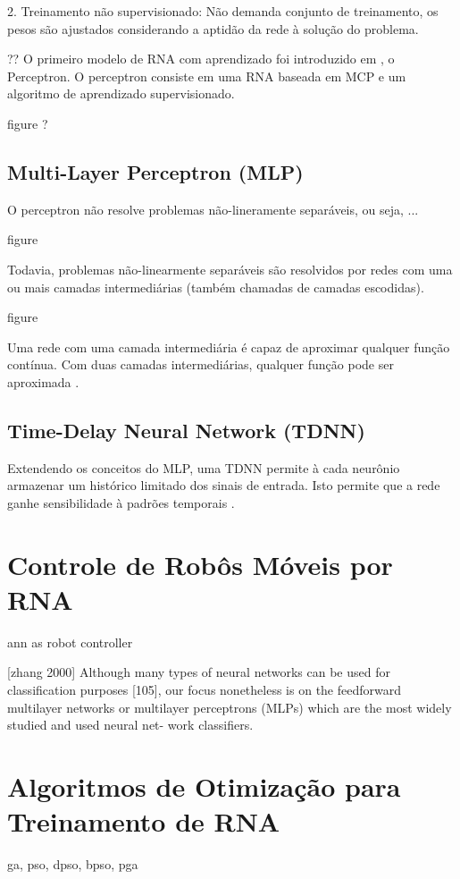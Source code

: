 2. Treinamento não supervisionado: Não demanda conjunto de treinamento, os pesos
são ajustados considerando a aptidão da rede à solução do problema.

?? O primeiro modelo de RNA com aprendizado foi introduzido em
\cite{rosenblatt58perceptron}, o Perceptron. O perceptron consiste em uma RNA
baseada em MCP e um algoritmo de aprendizado supervisionado.

figure ?

\subsection{Multi-Layer Perceptron (MLP)}

O perceptron não resolve problemas não-lineramente separáveis, ou seja, ...

figure

Todavia, problemas não-linearmente separáveis são resolvidos por redes com uma
ou mais camadas intermediárias (também chamadas de camadas escodidas).

figure

Uma rede com uma camada intermediária é capaz de aproximar qualquer função
contínua. Com duas camadas intermediárias, qualquer função pode ser aproximada
\cite{cybenko89mlp}.

\subsection{Time-Delay Neural Network (TDNN)}

Extendendo os conceitos do MLP, uma TDNN permite à cada neurônio armazenar um
histórico limitado dos sinais de entrada. Isto permite que a rede ganhe
sensibilidade à padrões temporais \cite{kaiser94tdnn}.

\section{Controle de Robôs Móveis por RNA}

ann as robot controller

[zhang 2000]
Although many types of neural networks can be used
for classification purposes [105], our focus nonetheless is on
the feedforward multilayer networks or multilayer perceptrons
(MLPs) which are the most widely studied and used neural net-
work classifiers.

\section{Algoritmos de Otimização para Treinamento de RNA}
\label{optimization-algorithms}

ga, pso, dpso, bpso, pga